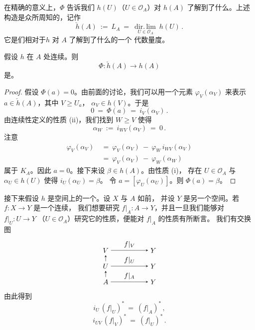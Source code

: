 在精确的意义上，$\Phi$ 告诉我们 $h(U)$（$U\in\mathcal{O}_{A}$）对 $h(A)$
了解到了什么。上述构造是众所周知的\trDirectedLimit，记作
\[\check{h}(A)\ :=\ L_{A}\ =\ \operatorname*{dir.\,lim}_{\,U\in\mathcal{O}_{A}}\ h(U)\,.
\]
它是\trNeighborhood{}们相对于\trContravariant\trFunctor $h$ 对 $A$ 了解到了什么的一个
代数量度。

\begin{theorem}\label{thm:a8-direct-limit-isomorphism}
假设 $h$ 在 $A$ 处连续。则
\[\Phi\colon \check{h}(A)\longrightarrow h(A)
\]
是\trIsomorphic。
\end{theorem}

\begin{proof}
假设 $\Phi(a)=0$。由前面的讨论，我们可以用一个元素
$\varphi_{V}(\alpha_{V})$ 来表示 $a\in\check{h}(A)$，其中 $V\geq U_{a}$，
$\alpha_{V}\in h(V)$。于是
\[0\ =\ \Phi(a)\ =\ i_{V}(\alpha_{V})\,.
\]
由连续性定义的性质 \textup{(ii)}，我们找到 $W\geq V$ 使得
\[\alpha_{W}\ :=\ i_{WV}(\alpha_{V})\ =\ 0\,.
\]
注意
\begin{align*}
\varphi_{V}(\alpha_{V})\ &=\ \varphi_{V}(\alpha_{V})\ -\ \varphi_{W}\,i_{WV}(\alpha_{V})\\
&=\ \varphi_{V}(\alpha_{V})\ -\ \varphi_{W}(\alpha_{W})
\end{align*}
属于 $K_{A}$。因此 $a=0$。接下来设 $\beta\in h(A)$。由性质 \textup{(i)}，
存在 $U\in\mathcal{O}_{A}$ 与 $\alpha_{U}\in h(U)$ 使得 $i_{U}(\alpha_{U})=\beta$。
令 $a=[\varphi_{U}(\alpha_{U})]$。则 $\Phi(a)=\beta$。
\end{proof}

接下来假设 $h$ 是\trTopology{}空间\trCategoryTheory{}上的一个\trContravariant\trFunctor。设 $X$ 与 $A$ 如前，
并设 $Y$ 是另一个\trTopology{}空间。若 $f\colon X\to Y$ 是一个连续\trMapping，
我们想要研究 $f|_{A}\colon A\to Y$，并且一旦我们能够对 $f|_{U}\colon U\to Y$
（$U\in\mathcal{O}_{A}$）研究它的性质，便能对 $f|_{A}$ 的性质有所断言。
我们有交换图
\[
\begin{tikzpicture}[>=stealth, baseline=(U.base)]
\node (V) at (0,1.6) {$V$};
\node (U) at (0,0.8) {$U$};
\node (A) at (0,0)   {$A$};
\node (Y1) at (2.4,1.6) {$Y$};
\node (Y2) at (2.4,0.8) {$Y$};
\node (Y3) at (2.4,0)   {$Y$};
\draw[->] (A) -- (U);
\draw[->] (U) -- (V);
\draw[->] (V) -- node[above]{$f|_{V}$} (Y1);
\draw[->] (U) -- node[above]{$f|_{U}$} (Y2);
\draw[->] (A) -- node[above]{$f|_{A}$} (Y3);
\end{tikzpicture}
\]
由此得到
\[i_{U}\,(f|_{U})^{*}\ =\ (f|_{A})^{*}\,,
\]
\[i_{UV}\,(f|_{V})^{*}\ =\ (f|_{U})^{*}\,.
\]

